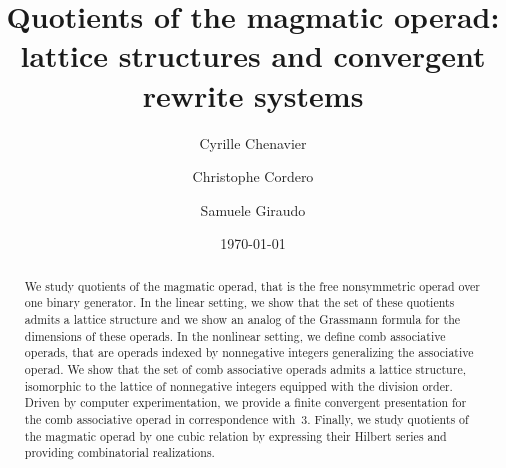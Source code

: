 \documentclass[10pt,reqno]{amsart}
\title[Quotients of the magmatic operad]
      {Quotients of the magmatic operad:\\
        lattice structures and convergent rewrite systems}
\date{\today}
\author{Cyrille Chenavier \and Christophe Cordero \and Samuele Giraudo}
\numberwithin{equation}{subsection}
\begin{document}
\begin{abstract}
    We study quotients of the magmatic operad, that is the free
    nonsymmetric operad over one binary generator. In the linear
    setting, we show that the set of these quotients admits a lattice
    structure and we show an analog of the Grassmann formula for the
    dimensions of these operads. In the nonlinear setting, we define
    comb associative operads, that are operads indexed by nonnegative
    integers generalizing the associative operad. We show that the set
    of comb associative operads admits a lattice structure, isomorphic
    to the lattice of nonnegative integers equipped with the division
    order. Driven by computer experimentation, we provide a finite
    convergent presentation for the comb associative operad in
    correspondence with~$3$. Finally, we study quotients of the magmatic
    operad by one cubic relation by expressing their Hilbert series and
    providing combinatorial realizations.
\end{abstract}

\maketitle

\begin{small}
\tableofcontents
\end{small}








\end{document}
